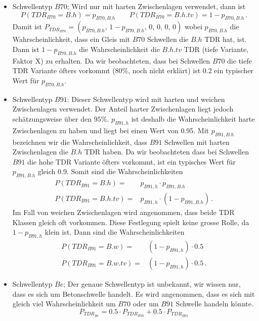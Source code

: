 \begin{itemize}
\item Schwellentyp $B70$; Wird nur mit harten Zwischenlagen verwendet, dann ist
\begin{equation*}
	P(TDR_{B70}=B.h)= p_{B70,B.h}\qquad P(TDR_{B70}=B.h.tv)=1- p_{B70,B.h}\,.
\end{equation*}
Damit ist $P_{TDR_{B70}}=(p_{B70,B.h},\,1- p_{B70,B.h},\,0,\,0,\,0,\,0)$ wobei $p_{B70,B.h}$ die Wahrscheinlichkeit, dass ein Gleis mit $B70$ Schwellen die $B.h$ TDR hat, ist. Dann ist $1- p_{B70,B.h}$ die Wahrscheinlichkeit die  $B.h.tv$ TDR (tiefe Variante, Faktor X) zu erhalten. Da wir beobachteten, dass bei Schwellen $B70$ die tiefe TDR Variante öfters vorkommt (80\%, noch nicht erklärt) ist 0.2 ein typischer Wert für $p_{B70,B.h}$.

\item Schwellentyp $B91$: Dieser Schwellentyp wird mit harten und weichen Zwischenlagen verwendet. Der Anteil harter Zwischenlagen liegt jedoch schätzungsweise über den $95\%$. $p_{B91,h}$ ist deshalb die Wahrscheinlichkeit harte Zwischenlagen zu haben und liegt bei einen Wert von 0.95. Mit $p_{B91,B.h}$ bezeichnen wir die Wahrscheinlichkeit, dass $B91$ Schwellen mit harten Zwischenlagen die $B.h$ TDR haben. Da wir beobachteten dass bei Schwellen $B91$ die hohe TDR Variante öfters vorkommt, ist ein typisches Wert für $p_{B91,B.h}$ gleich 0.9. Somit sind die Wahrscheinlichkeiten
\begin{align*}
	P(TDR_{B91}=B.h)=& p_{B91,h}\cdot p_{B91,B.h} \\
	 P(TDR_{B91}=B.h.tv)=& p_{B91,h}\cdot(1-p_{B91,B.h})\,.
\end{align*}
Im Fall von weichen Zwischenlagen wird angenommen, dass beide TDR Klassen gleich oft vorkommen. Diese Festlegung spielt keine grosse Rolle, da $1-p_{B91,h}$ klein ist. Dann sind die Wahrscheinlichkeiten
\begin{align*}
	 P(TDR_{B91}=B.w)= & (1-p_{B91,h})\cdot 0.5  \\
	 P(TDR_{B91}=B.w.tv)=& (1-p_{B91,h})\cdot 0.5 \,.
\end{align*}
\item Schwellentyp $Be$; Der genaue Schwellentyp ist unbekannt, wir wissen nur, dass es sich um Betonschwelle handelt. Es wird angenommen, dass es sich mit gleich viel Wahrscheinlichkeit um $B70$ oder um $B91$ Schwelle handeln könnte.
\begin{equation*}
	P_{TDR_{Be}}= 0.5\cdot P_{TDR_{B70}} + 0.5\cdot P_{TDR_{B91}}
\end{equation*}

\end{itemize}
